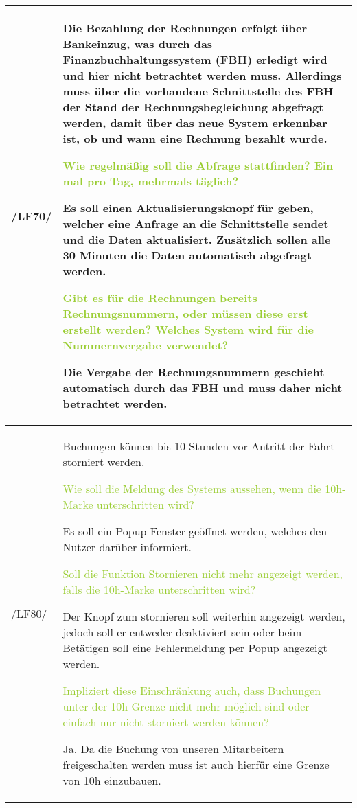 \begin{tabular}[ht] {l | p{13cm}}
    \hline
    /LF70/ & Die Bezahlung der Rechnungen erfolgt über Bankeinzug, was durch das Finanzbuchhaltungssystem (FBH) erledigt wird und hier nicht betrachtet werden muss. Allerdings muss über die vorhandene Schnittstelle des FBH der Stand der Rechnungsbegleichung abgefragt werden, damit über das neue System erkennbar ist, ob und wann eine Rechnung bezahlt wurde. 
    


    \textcolor{YellowGreen}{Wie regelmäßig soll die Abfrage stattfinden? Ein mal pro Tag, mehrmals täglich?}

    \textcolor{NavyBlue}{Es soll einen Aktualisierungsknopf für geben, welcher eine Anfrage an die Schnittstelle sendet und die Daten aktualisiert. Zusätzlich sollen alle 30 Minuten die Daten automatisch abgefragt werden.}

    \textcolor{YellowGreen}{Gibt es für die Rechnungen bereits Rechnungsnummern, oder müssen diese erst erstellt werden? Welches System wird für die Nummernvergabe verwendet?}
    
    \textcolor{NavyBlue}{Die Vergabe der Rechnungsnummern geschieht automatisch durch das FBH und muss daher nicht betrachtet werden.}
    \\
    \hline
    /LF80/ & Buchungen können bis 10 Stunden vor Antritt der Fahrt storniert werden. 
    
    \textcolor{YellowGreen}{Wie soll die Meldung des Systems aussehen, wenn die 10h-Marke unterschritten wird?}

    \textcolor{NavyBlue}{Es soll ein Popup-Fenster geöffnet werden, welches den Nutzer darüber informiert.}

    \textcolor{YellowGreen}{Soll die Funktion \grqq{}Stornieren\grqq{} nicht mehr angezeigt werden, falls die 10h-Marke unterschritten wird?}

    \textcolor{NavyBlue}{Der Knopf zum stornieren soll weiterhin angezeigt werden, jedoch soll er entweder deaktiviert sein oder beim Betätigen soll eine Fehlermeldung per Popup angezeigt werden.}

    \textcolor{YellowGreen}{Impliziert diese Einschränkung auch, dass Buchungen unter der 10h-Grenze nicht mehr möglich sind oder einfach nur nicht storniert werden können?}

    \textcolor{NavyBlue}{Ja. Da die Buchung von unseren Mitarbeitern freigeschalten werden muss ist auch hierfür eine Grenze von 10h einzubauen.}
    \\
    \hline
\end{tabular}

